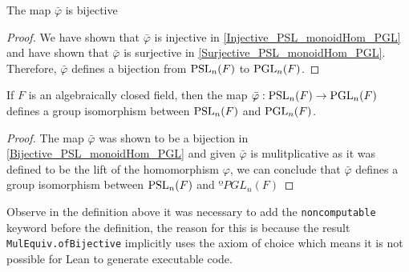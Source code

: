 \begin{lemma}
\label{Bijective_PSL_monoidHom_PGL}
\leanok
    The map $\bar{\varphi}$ is bijective
\end{lemma}
\begin{proof}
\leanok
 We have shown that $\bar{\varphi}$ is injective in \ref{Injective_PSL_monoidHom_PGL} and have shown that $\bar{\varphi}$ is surjective in \ref{Surjective_PSL_monoidHom_PGL}. 
 Therefore, $\bar{\varphi}$ defines a bijection from $\operatorname{PSL}_n(F)$ to $\operatorname{PGL}_n(F)$.
\end{proof}


\begin{theorem}
\label{PGL_iso_PSL}
\leanok
    If $F$ is an algebraically closed field, then the map $\bar{\varphi} : \operatorname{PSL}_n(F) \rightarrow \operatorname{PGL}_n(F)$ defines a group isomorphism between $\operatorname{PSL}_n(F)$ and $\operatorname{PGL}_n(F)$.
\end{theorem}

\begin{proof}
\leanok
    The map $\bar{\varphi}$ was shown to be a bijection in \ref{Bijective_PSL_monoidHom_PGL} and given $\bar{\varphi}$ is mulitplicative as it was defined to be the lift of the homomorphism $\varphi$, we can conclude that 
    $\bar{\varphi}$ defines a group isomorphism between $\operatorname{PSL}_n(F)$ and $ºPGL_n(F)$
\end{proof}


\begin{remark}[Noncomputable]
    Observe in the definition above it was necessary to add the \texttt{noncomputable} keyword before the definition, the reason for this is
    because the result \texttt{MulEquiv.ofBijective} implicitly uses the axiom of choice which means it is not possible for Lean to generate
    executable code.
\end{remark}




